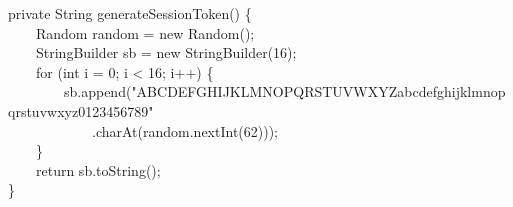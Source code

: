 ﻿\documentclass{article}
\begin{document}
\small\ttfamily
private String generateSessionToken() \{\\
\ \ \ \ Random random = new Random();\\
\ \ \ \ StringBuilder sb = new StringBuilder(16);\\
\ \ \ \ for (int i = 0; i < 16; i++) \{\\
\ \ \ \ \ \ \ \ sb.append("ABCDEFGHIJKLMNOPQRSTUVWXYZabcdefghijklmnopqrstuvwxyz0123456789"\\
\ \ \ \ \ \ \ \ \ \ \ \ .charAt(random.nextInt(62)));\\
\ \ \ \ \}\\
\ \ \ \ return sb.toString();\\
\}
\end{document}
